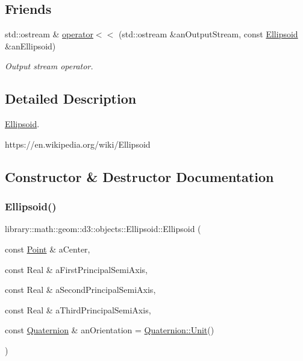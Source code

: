 \subsection*{Friends}
\begin{DoxyCompactItemize}
\item 
std\+::ostream \& \hyperlink{classlibrary_1_1math_1_1geom_1_1d3_1_1objects_1_1_ellipsoid_a95f4f6dc4d64843c673c7ac965468a2c}{operator$<$$<$} (std\+::ostream \&an\+Output\+Stream, const \hyperlink{classlibrary_1_1math_1_1geom_1_1d3_1_1objects_1_1_ellipsoid}{Ellipsoid} \&an\+Ellipsoid)
\begin{DoxyCompactList}\small\item\em Output stream operator. \end{DoxyCompactList}\end{DoxyCompactItemize}


\subsection{Detailed Description}
\hyperlink{classlibrary_1_1math_1_1geom_1_1d3_1_1objects_1_1_ellipsoid}{Ellipsoid}. 

https\+://en.wikipedia.\+org/wiki/\+Ellipsoid 

\subsection{Constructor \& Destructor Documentation}
\mbox{\label{classlibrary_1_1math_1_1geom_1_1d3_1_1objects_1_1_ellipsoid_aae81fe0edc7f0e8d4590ea89ae73cb14}} 
\subsubsection{\texorpdfstring{Ellipsoid()}{Ellipsoid()}}
{\footnotesize\ttfamily library\+::math\+::geom\+::d3\+::objects\+::\+Ellipsoid\+::\+Ellipsoid (\begin{DoxyParamCaption}\item[{const \hyperlink{classlibrary_1_1math_1_1geom_1_1d3_1_1objects_1_1_point}{Point} \&}]{a\+Center,  }\item[{const Real \&}]{a\+First\+Principal\+Semi\+Axis,  }\item[{const Real \&}]{a\+Second\+Principal\+Semi\+Axis,  }\item[{const Real \&}]{a\+Third\+Principal\+Semi\+Axis,  }\item[{const \hyperlink{classlibrary_1_1math_1_1geom_1_1trf_1_1rot_1_1_quaternion}{Quaternion} \&}]{an\+Orientation = {\ttfamily \hyperlink{classlibrary_1_1math_1_1geom_1_1trf_1_1rot_1_1_quaternion_aa7cb20c2918d117edb85073bffb3a381}{Quaternion\+::\+Unit}()} }\end{DoxyParamCaption})}



